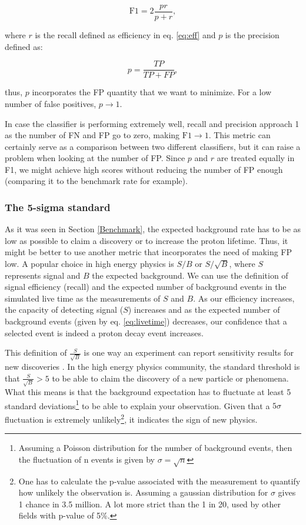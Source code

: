 \begin{equation} \label{eq:F1}
\textrm{F1} = 2\frac{pr}{p+r},
\end{equation}

where $r$ is the recall defined as efficiency in eq. \ref{eq:eff} and $p$ is the precision defined as:

\begin{equation} \label{eq:precision}
p = \frac{TP}{TP + FP},
\end{equation}

thus, $p$ incorporates the FP quantity that we want to minimize. For a low number of false positives, $p\rightarrow 1$.

In case the classifier is performing extremely well, recall and precision approach 1 as the number of FN and FP go to zero, making $\textrm{F1}\rightarrow 1$. This metric can certainly serve as a comparison between two different classifiers, but it can raise a problem when looking at the number of FP. Since $p$ and $r$ are treated equally in F1, we might achieve high scores without reducing the number of FP enough (comparing it to the benchmark rate for example).

\subsubsection{The 5-sigma standard} \label{5sigma}

As it was seen in Section \ref{Benchmark}, the expected background rate has to be as low as possible to claim a discovery or to increase the proton lifetime. Thus, it might be better to use another metric that incorporates the need of making FP low. A popular choice in high energy physics is $S/B$ or $S/\sqrt{B}$, where $S$ represents signal and $B$ the expected background. We can use the definition of signal efficiency (recall) and the expected number of background events in the simulated live time as the measurements of $S$ and $B$. As our efficiency increases, the capacity of detecting signal ($S$) increases and as the expected number of background events (given by eq. \ref{eq:livetime}) decreases, our confidence that a selected event is indeed a proton decay event increases.

This definition of $\frac{S}{\sqrt{B}}$ is one way an experiment can report sensitivity results for new discoveries \cite{Higgs}. In the high energy physics community, the standard threshold is that $\frac{S}{\sqrt{B}} > 5$ to be able to claim the discovery of a new particle or phenomena. What this means is that the background expectation has to fluctuate at least 5 standard deviations\footnote{Assuming a Poisson distribution for the number of background events, then the fluctuation of n events is given by $\sigma = \sqrt{n}$} to be able to explain your observation. Given that a $5\sigma$ fluctuation is extremely unlikely\footnote{One has to calculate the p-value associated with the measurement to quantify how unlikely the observation is. Assuming a gaussian distribution for $\sigma$ gives 1 chance in 3.5 million. A lot more strict than the 1 in 20, used by other fields with p-value of 5\%. }, it indicates the sign of new physics. 

